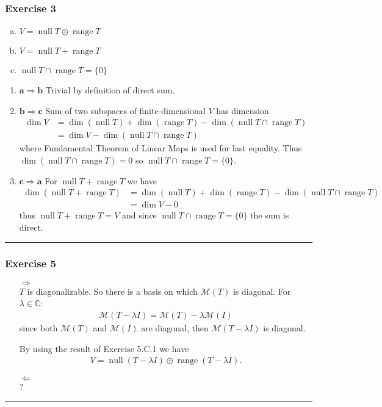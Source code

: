 \documentclass[12pt, letterpaper]{scrartcl}
\newcommand{\C}{\mathbb{C}}
\DeclareMathOperator{\Null}{null}
\DeclareMathOperator{\Range}{range}
\begin{document}
\subsubsection*{Exercise 3}
\begin{enumerate}[(a)]
    \item $V=\Null T\oplus\Range T$
    \item $V=\Null T+\Range T$
    \item $\Null T\cap\Range T=\{0\}$
\end{enumerate}
\begin{enumerate}
    \item {\color{purple}$\mathbf{a\Rightarrow b}$} Trivial by definition of direct sum.

    \item {\color{purple}$\mathbf{b\Rightarrow c}$} Sum of two subspaces of finite-dimensional $V$ has dimension
    \begin{align*}
        \dim V&=\dim(\Null T)+\dim(\Range T)-\dim(\Null T\cap\Range T)\\
        &=\dim V-\dim(\Null T\cap\Range T)
    \end{align*} where Fundamental Theorem of Linear Maps is used for last equality. Thus $\dim(\Null T\cap\Range T)=0$ so $\Null T\cap\Range T=\{0\}$.

    \item {\color{purple}$\mathbf{c\Rightarrow a}$} For $\Null T+\Range T$ we have
    \begin{align*}
        \dim(\Null T+\Range T)&=\dim(\Null T)+\dim(\Range T)-\dim(\Null T\cap\Range T)\\
        &=\dim V-0
    \end{align*}
    thus $\Null T+\Range T=V$ and since $\Null T\cap\Range T=\{0\}$ the sum is direct.
\end{enumerate}
\vskip1mm\hrule


\subsubsection*{Exercise 5}
\begin{itemize}
    \item[$\Longrightarrow$]\mbox{}\\
    $T$ is diagonalizable. So there is a basis on which $\mathcal{M}(T)$ is diagonal.
    For $\lambda\in \C$:
    \begin{align*}
        \mathcal{M}(T-\lambda I)=\mathcal{M}(T)-\lambda \mathcal{M}(I)
    \end{align*}
    since both $\mathcal{M}(T)$ and $\mathcal{M}(I)$ are diagonal, then $\mathcal{M}(T-\lambda I)$ is diagonal.

    By using the result of Exercise 5.C.1 we have
    \begin{align*}
        V=\Null(T-\lambda I)\oplus\Range(T-\lambda I).
    \end{align*}
    
    \item[$\Longleftarrow$]\mbox{}\\
    ?
\end{itemize}
\vskip1mm\hrule
\end{document}
